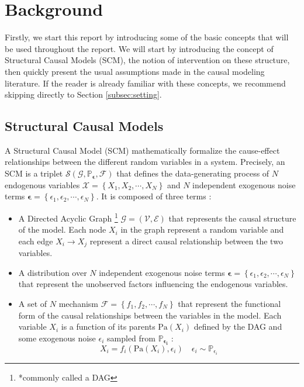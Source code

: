 \documentclass{article}
\begin{document}
\section{Background}\label{subsec:background}

Firstly, we start this report by introducing some of the basic concepts that will be used throughout the report. We will start by introducing the concept of Structural Causal Models (SCM), the notion of intervention on these structure, then quickly present the usual assumptions made in the causal modeling literature. If the reader is already familiar with these concepts, we recommend skipping directly to Section \ref{subsec:setting}.
\subsection{Structural Causal Models}

A Structural Causal Model (SCM) mathematically formalize the cause-effect relationships between the different random variables in a system. Precisely, an SCM is a triplet $\mathcal{S}(\mathcal{G},\mathbb{P}_{\boldsymbol{\epsilon}}, \mathcal{F})$ that defines the data-generating process of $N$ endogenous variables $\mathcal{X} = \left\{ X_1, X_2, \cdots, X_N \right\}$ and $N$ independent exogenous noise terms $\boldsymbol{\epsilon} = \left\{ \epsilon_1, \epsilon_2, \cdots, \epsilon_N \right\}$. It is composed of three terms :
\begin{itemize}
    \item A Directed Acyclic Graph \footnote{*commonly called a DAG} $\mathcal{G} = \left( \mathcal{V}, \mathcal{E} \right)$ that represents the causal structure of the model. Each node $X_i$ in the graph represent a random variable and each edge $X_i \rightarrow X_j$ represent a direct causal relationship between the two variables.
    \item A distribution over $N$ independent exogenous noise terms $\boldsymbol{\epsilon} = \left\{ \epsilon_1, \epsilon_2, \cdots, \epsilon_N \right\}$ that represent the unobserved factors influencing the endogenous variables.
    \item A set of $N$ mechanism $\mathcal{F} = \left\{ f_1, f_2, \cdots, f_N \right\}$ that represent the functional form of the causal relationships between the variables in the model. Each variable $X_i$ is a function of its parents $\text{Pa}(X_i)$ defined by the DAG and some exogenous noise $\epsilon_i$ sampled from $\mathbb{P}_{\boldsymbol{\epsilon_i}}$ :
    \begin{equation}
    X_i  = f_i(\text{Pa}(X_i), \epsilon_i)  \quad \epsilon_i \sim \mathbb{P}_{\epsilon_i}
    \end{equation}
\end{itemize}
\end{document}

